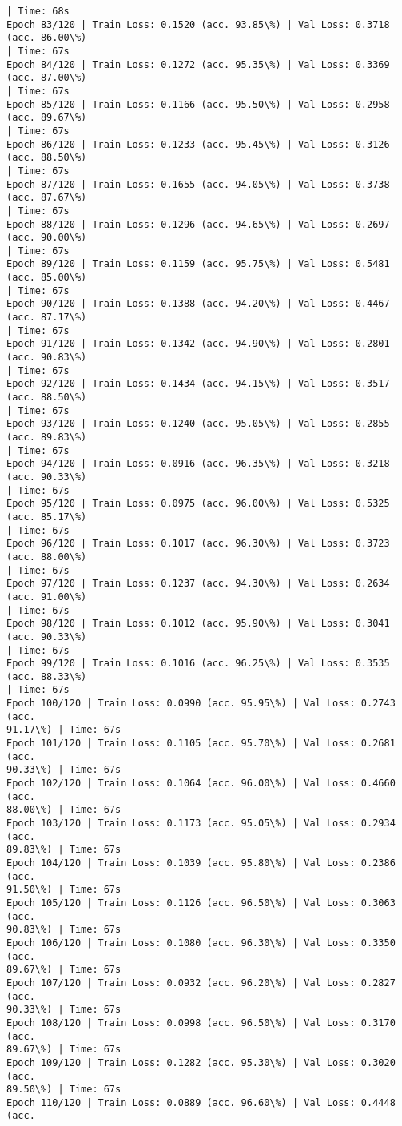 \documentclass[8pt]{extarticle}
\begin{document}
\begin{Verbatim}[commandchars=\\\{\}]
| Time: 68s
Epoch 83/120 | Train Loss: 0.1520 (acc. 93.85\%) | Val Loss: 0.3718 (acc. 86.00\%)
| Time: 67s
Epoch 84/120 | Train Loss: 0.1272 (acc. 95.35\%) | Val Loss: 0.3369 (acc. 87.00\%)
| Time: 67s
Epoch 85/120 | Train Loss: 0.1166 (acc. 95.50\%) | Val Loss: 0.2958 (acc. 89.67\%)
| Time: 67s
Epoch 86/120 | Train Loss: 0.1233 (acc. 95.45\%) | Val Loss: 0.3126 (acc. 88.50\%)
| Time: 67s
Epoch 87/120 | Train Loss: 0.1655 (acc. 94.05\%) | Val Loss: 0.3738 (acc. 87.67\%)
| Time: 67s
Epoch 88/120 | Train Loss: 0.1296 (acc. 94.65\%) | Val Loss: 0.2697 (acc. 90.00\%)
| Time: 67s
Epoch 89/120 | Train Loss: 0.1159 (acc. 95.75\%) | Val Loss: 0.5481 (acc. 85.00\%)
| Time: 67s
Epoch 90/120 | Train Loss: 0.1388 (acc. 94.20\%) | Val Loss: 0.4467 (acc. 87.17\%)
| Time: 67s
Epoch 91/120 | Train Loss: 0.1342 (acc. 94.90\%) | Val Loss: 0.2801 (acc. 90.83\%)
| Time: 67s
Epoch 92/120 | Train Loss: 0.1434 (acc. 94.15\%) | Val Loss: 0.3517 (acc. 88.50\%)
| Time: 67s
Epoch 93/120 | Train Loss: 0.1240 (acc. 95.05\%) | Val Loss: 0.2855 (acc. 89.83\%)
| Time: 67s
Epoch 94/120 | Train Loss: 0.0916 (acc. 96.35\%) | Val Loss: 0.3218 (acc. 90.33\%)
| Time: 67s
Epoch 95/120 | Train Loss: 0.0975 (acc. 96.00\%) | Val Loss: 0.5325 (acc. 85.17\%)
| Time: 67s
Epoch 96/120 | Train Loss: 0.1017 (acc. 96.30\%) | Val Loss: 0.3723 (acc. 88.00\%)
| Time: 67s
Epoch 97/120 | Train Loss: 0.1237 (acc. 94.30\%) | Val Loss: 0.2634 (acc. 91.00\%)
| Time: 67s
Epoch 98/120 | Train Loss: 0.1012 (acc. 95.90\%) | Val Loss: 0.3041 (acc. 90.33\%)
| Time: 67s
Epoch 99/120 | Train Loss: 0.1016 (acc. 96.25\%) | Val Loss: 0.3535 (acc. 88.33\%)
| Time: 67s
Epoch 100/120 | Train Loss: 0.0990 (acc. 95.95\%) | Val Loss: 0.2743 (acc.
91.17\%) | Time: 67s
Epoch 101/120 | Train Loss: 0.1105 (acc. 95.70\%) | Val Loss: 0.2681 (acc.
90.33\%) | Time: 67s
Epoch 102/120 | Train Loss: 0.1064 (acc. 96.00\%) | Val Loss: 0.4660 (acc.
88.00\%) | Time: 67s
Epoch 103/120 | Train Loss: 0.1173 (acc. 95.05\%) | Val Loss: 0.2934 (acc.
89.83\%) | Time: 67s
Epoch 104/120 | Train Loss: 0.1039 (acc. 95.80\%) | Val Loss: 0.2386 (acc.
91.50\%) | Time: 67s
Epoch 105/120 | Train Loss: 0.1126 (acc. 96.50\%) | Val Loss: 0.3063 (acc.
90.83\%) | Time: 67s
Epoch 106/120 | Train Loss: 0.1080 (acc. 96.30\%) | Val Loss: 0.3350 (acc.
89.67\%) | Time: 67s
Epoch 107/120 | Train Loss: 0.0932 (acc. 96.20\%) | Val Loss: 0.2827 (acc.
90.33\%) | Time: 67s
Epoch 108/120 | Train Loss: 0.0998 (acc. 96.50\%) | Val Loss: 0.3170 (acc.
89.67\%) | Time: 67s
Epoch 109/120 | Train Loss: 0.1282 (acc. 95.30\%) | Val Loss: 0.3020 (acc.
89.50\%) | Time: 67s
Epoch 110/120 | Train Loss: 0.0889 (acc. 96.60\%) | Val Loss: 0.4448 (acc.

\end{Verbatim}
\end{document}

